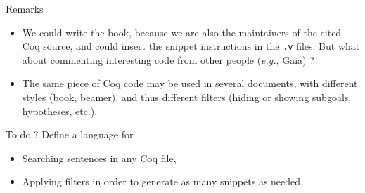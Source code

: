 \documentclass[10pt]{beamer}
\newcommand{\coq}{Coq\xspace}
\newcommand{\gaia}{Gaia\xspace}
\begin{document}
\begin{frame}
    
  \begin{block}{Remarks}
    \begin{itemize}
    \item We could write the book, because we are also the maintainers of the cited \coq source, and could insert the snippet instructions in the \texttt{.v} files. \textcolor{lookcolor}{But what about commenting interesting code from other people (\emph{e.g.},
        \gaia) ?}
    \item The same  piece of \coq code may be used in several documents, with different styles (book, beamer), and thus
      different filters (hiding or showing subgoals, hypotheses, etc.).
      
    \end{itemize}
  \end{block}

  \begin{block}{To do ?}
    Define a language for
    \begin{itemize}
    \item Searching sentences in any \coq file,
    \item Applying filters in order to generate as many snippets as needed.
    \end{itemize}
  \end{block}
\end{frame}
\end{document}
